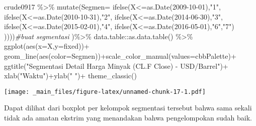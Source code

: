 \documentclass[
]{book}
\newenvironment{Shaded}{\begin{snugshade}}{\end{snugshade}}
\newcommand{\AttributeTok}[1]{\textcolor[rgb]{0.77,0.63,0.00}{#1}}
\newcommand{\CommentTok}[1]{\textcolor[rgb]{0.56,0.35,0.01}{\textit{#1}}}
\newcommand{\FunctionTok}[1]{\textcolor[rgb]{0.00,0.00,0.00}{#1}}
\newcommand{\NormalTok}[1]{#1}
\newcommand{\SpecialCharTok}[1]{\textcolor[rgb]{0.00,0.00,0.00}{#1}}
\newcommand{\StringTok}[1]{\textcolor[rgb]{0.31,0.60,0.02}{#1}}
\begin{document}
\begin{Shaded}
\begin{Highlighting}[]
\NormalTok{crude0917 }\SpecialCharTok{\%\textgreater{}\%}
  \FunctionTok{mutate}\NormalTok{(}\AttributeTok{Segmen=}
          \FunctionTok{ifelse}\NormalTok{(X}\SpecialCharTok{\textless{}=}\FunctionTok{as.Date}\NormalTok{(}\StringTok{\textquotesingle{}2009{-}10{-}01\textquotesingle{}}\NormalTok{),}\StringTok{"1"}\NormalTok{,}
          \FunctionTok{ifelse}\NormalTok{(X}\SpecialCharTok{\textless{}=}\FunctionTok{as.Date}\NormalTok{(}\StringTok{\textquotesingle{}2010{-}10{-}31\textquotesingle{}}\NormalTok{),}\StringTok{"2"}\NormalTok{,}
          \FunctionTok{ifelse}\NormalTok{(X}\SpecialCharTok{\textless{}=}\FunctionTok{as.Date}\NormalTok{(}\StringTok{\textquotesingle{}2014{-}06{-}30\textquotesingle{}}\NormalTok{),}\StringTok{"3"}\NormalTok{,}
          \FunctionTok{ifelse}\NormalTok{(X}\SpecialCharTok{\textless{}=}\FunctionTok{as.Date}\NormalTok{(}\StringTok{\textquotesingle{}2015{-}02{-}01\textquotesingle{}}\NormalTok{),}\StringTok{"4"}\NormalTok{,}
          \FunctionTok{ifelse}\NormalTok{(X}\SpecialCharTok{\textless{}=}\FunctionTok{as.Date}\NormalTok{(}\StringTok{\textquotesingle{}2016{-}05{-}01\textquotesingle{}}\NormalTok{),}\StringTok{"6"}\NormalTok{,}\StringTok{"7"}\NormalTok{)}
\NormalTok{          ))))}\CommentTok{\#buat segmentasi }
\NormalTok{  )}\SpecialCharTok{\%\textgreater{}\%}\NormalTok{ data.table}\SpecialCharTok{::}\FunctionTok{as.data.table}\NormalTok{() }\SpecialCharTok{\%\textgreater{}\%}
  \FunctionTok{ggplot}\NormalTok{(}\FunctionTok{aes}\NormalTok{(}\AttributeTok{x=}\NormalTok{X,}\AttributeTok{y=}\NormalTok{fixed))}\SpecialCharTok{+}
  \FunctionTok{geom\_line}\NormalTok{(}\FunctionTok{aes}\NormalTok{(}\AttributeTok{color=}\NormalTok{Segmen))}\SpecialCharTok{+}\FunctionTok{scale\_color\_manual}\NormalTok{(}\AttributeTok{values=}\NormalTok{cbbPalette)}\SpecialCharTok{+}
  \FunctionTok{ggtitle}\NormalTok{(}\StringTok{"Segmentasi Detail Harga Minyak (CL.F Close) {-} USD/Barrel"}\NormalTok{)}\SpecialCharTok{+}
  \FunctionTok{xlab}\NormalTok{(}\StringTok{"Waktu"}\NormalTok{)}\SpecialCharTok{+}\FunctionTok{ylab}\NormalTok{(}\StringTok{" "}\NormalTok{)}\SpecialCharTok{+}
  \FunctionTok{theme\_classic}\NormalTok{()}
\end{Highlighting}
\end{Shaded}

\texttt{[image: \_main\_files/figure-latex/unnamed-chunk-17-1.pdf]}

Dapat dilihat dari boxplot per kelompok segmentasi tersebut bahwa sama sekali tidak ada amatan ekstrim yang menandakan bahwa pengelompokan sudah baik.
\end{document}
